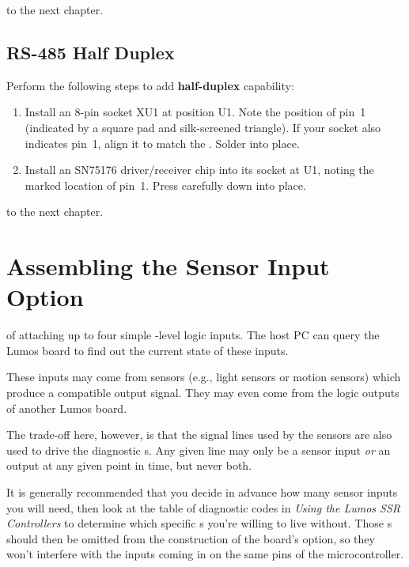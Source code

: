 \documentclass[letterpaper,twoside,onecolumn,openright,final]{memoir}
\begin{document}
\bigskip{} to the next chapter.

\section{RS-485 Half Duplex}
Perform the following steps to add {\bfseries half-duplex}  capability:
\begin{enumerate}
\item	Install an 8-pin  socket XU1 at position U1.  Note the position of pin~1 (indicated
	by a square pad and silk-screened triangle).  If your socket also indicates pin~1, align
	it to match the . Solder into place.
\item	Install an SN75176 driver/receiver chip into its socket at U1, noting the marked location
	of pin~1.  Press carefully down into place.
\end{enumerate}

\bigskip{} to the next chapter.

\chapter{Assembling the Sensor Input Option}\label{ch:sensor-in}
 of attaching up to four simple -level
logic inputs.  The host PC can query the Lumos board to find out the current state of these
inputs.  %

These inputs may come from sensors (e.g., light sensors or motion sensors) which produce a compatible
output signal.  They may even come from the logic outputs of another Lumos board.

The trade-off here, however, is that the signal lines used by the sensors are also used to drive
the diagnostic s.  Any given line may only be a sensor input \emph{or} an 
output at any given point in time, but never both.

It is generally recommended that you decide in advance how many sensor inputs you will need, then
look at the table of diagnostic codes in \emph{Using the Lumos SSR Controllers} to determine which
specific s you're willing to live without.  Those s should then be omitted
from the construction of the board's  option, so they won't interfere with the
inputs coming in on the same pins of the microcontroller.
\end{document}
